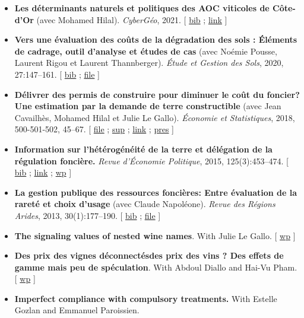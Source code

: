 \documentclass[11pt, a4paper]{./style}
\begin{document}
\label{sec:org24910bc}

\begin{itemize}
\item \textbf{Les déterminants naturels et politiques des AOC viticoles de
Côte-d’Or} (avec Mohamed Hilal). \emph{CyberGéo}, 2021. [ \href{bib/DNPA.bib}{bib} ; \href{https://journals.openedition.org/cybergeo/36443\#authors}{link} ]
\item \textbf{Vers une évaluation des coûts de la dégradation des sols :
Éléments de cadrage, outil d'analyse et études de cas} (avec
Noémie Pousse, Laurent Rigou et Laurent Thannberger). \emph{Étude et
Gestion des Sols}, 2020, 27:147--161. [ \href{bib/GPRF.bib}{bib} ; \href{doc/ECOSOL-FILE.pdf}{file} ]
\item \textbf{Délivrer des permis de construire pour diminuer le coût du
foncier? Une estimation par la demande de terre constructible}
(avec Jean Cavailhès, Mohamed Hilal et Julie Le Gallo).
\emph{Économie et Statistiques}, 2018, 500-501-502, 45--67. [ \href{doc/PCPXf-FILE.pdf}{file} ;
\href{doc/PCPX-SUP.pdf}{sup} ; \href{https://insee.fr/fr/statistiques/3621977?sommaire=3622116}{link} ; \href{doc/PCPXf-PRES.pdf}{pres} ]
\item \textbf{Information sur l'hétérogénéité de la terre et délégation de la
régulation foncière.} \emph{Revue d'Économie Politique}, 2015,
125(3):453--474. [ \href{bib/IFHT.bib}{bib} ; \href{https://www.cairn.info/revue-d-economie-politique-2015-3-page-453.htm}{link} ; \href{http://ideas.repec.org/p/ceo/wpaper/32.html}{wp} ]
\item \textbf{La gestion publique des ressources foncières: Entre évaluation
de la rareté et choix d'usage} (avec Claude Napoléone). \emph{Revue
des Régions Arides}, 2013, 30(1):177--190. [ \href{bib/GPRF.bib}{bib} ; \href{https://www.researchgate.net/profile/Claude\_Napoleone/publication/268075060\_La\_gestion\_publique\_des\_ressources\_foncieres\_entre\_evaluation\_de\_la\_rarete\_et\_choix\_d'usages/links/5460bdd20cf295b5616376de/La-gestion-publique-des-ressources-foncieres-entre-evaluation-de-la-rarete-et-choix-dusages.pdf}{file} ]
\end{itemize}

\label{sec:orgf057c14}

\begin{itemize}
\item \textbf{The signaling values of nested wine names}. With Julie Le
Gallo. [ \href{https://wine-economics.org/wp-content/uploads/2021/05/AAWE\_WP265.pdf}{wp} ]
\item \textbf{Des prix des vignes déconnectésdes prix des vins ? Des effets de
gamme mais peu de spéculation}. With Abdoul Diallo and Hai-Vu
Pham. [ \href{https://www2.dijon.inrae.fr/cesaer/wp-content/uploads/2021/05/WP\_AY\_DIALLO\_PHAM.pdf}{wp} ]
\item \textbf{Imperfect compliance with compulsory treatments.} With Estelle
Gozlan and Emmanuel Paroissien.
\end{itemize}
\end{document}
